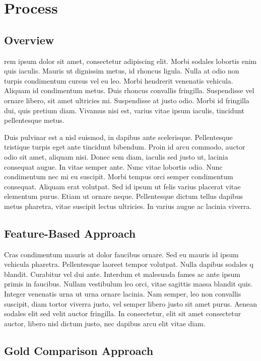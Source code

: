 \documentclass[preprint,5p,times,twocolumn]{elsarticle}
\begin{document}
\section{Process}
\label{process}

\subsection{Overview}
\label{process:overview}
rem ipsum dolor sit amet, consectetur adipiscing elit. Morbi sodales lobortis
enim quis iaculis. Mauris ut dignissim metus, id rhoncus ligula. Nulla at odio
non turpis condimentum cursus vel eu leo. Morbi hendrerit venenatis vehicula.
Aliquam id condimentum metus. Duis rhoncus convallis fringilla. Suspendisse vel
ornare libero, sit amet ultricies mi. Suspendisse at justo odio. Morbi id
fringilla dui, quis pretium diam. Vivamus nisi est, varius vitae ipsum iaculis,
tincidunt pellentesque metus.

Duis pulvinar est a nisl euismod, in dapibus ante scelerisque. Pellentesque
tristique turpis eget ante tincidunt bibendum. Proin id arcu commodo, auctor
odio sit amet, aliquam nisi. Donec sem diam, iaculis sed justo ut, lacinia
consequat augue. In vitae semper ante. Nunc vitae lobortis odio. Nunc
condimentum nec mi eu suscipit. Morbi tempus orci semper condimentum consequat.
Aliquam erat volutpat. Sed id ipsum ut felis varius placerat vitae elementum
purus. Etiam ut ornare neque. Pellentesque dictum tellus dapibus metus
pharetra, vitae suscipit lectus ultricies. In varius augue ac lacinia viverra.

\subsection{Feature-Based Approach}
\label{process:featurebased}

Cras condimentum mauris at dolor faucibus ornare. Sed eu mauris id ipsum
vehicula pharetra. Pellentesque laoreet tempor volutpat. Nulla dapibus sodales
q
blandit. Curabitur vel dui ante. Interdum et malesuada fames ac ante ipsum
primis in faucibus. Nullam vestibulum leo orci, vitae sagittis massa blandit
quis. Integer venenatis urna ut urna ornare lacinia. Nam semper, leo non
convallis suscipit, diam tortor viverra justo, vel semper libero justo sit amet
purus. Aenean sodales elit sed velit auctor fringilla. In consectetur, elit sit
amet consectetur auctor, libero nisl dictum justo, nec dapibus arcu elit vitae
diam.

\subsection{Gold Comparison Approach}
\label{process:gold}
\end{document}
